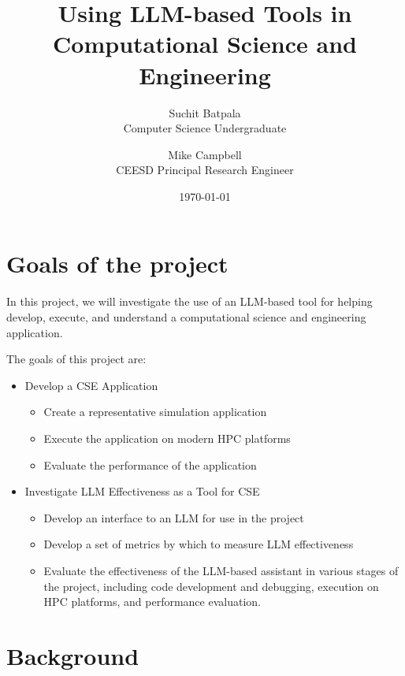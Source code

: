 \documentclass[11pt]{article}
\title{Using LLM-based Tools in Computational Science and Engineering}
\author{Suchit Batpala \\ \small{Computer Science Undergraduate} \and Mike Campbell \\ \small{CEESD Principal Research Engineer}}
\date{\today}
\begin{document}
\color{mainTextColor}
\maketitle

\section{Goals of the project}

In this project, we will investigate the use of an LLM-based tool for helping develop, execute, and understand a computational science and engineering application.

The goals of this project are:

\begin{itemize}
\item Develop a CSE Application
  \begin{itemize}
  \item Create a representative simulation application
  \item Execute the application on modern HPC platforms
  \item Evaluate the performance of the application
  \end{itemize}
\item Investigate LLM Effectiveness as a Tool for CSE
  \begin{itemize}
  \item Develop an interface to an LLM for use in the project
  \item Develop a set of metrics by which to measure LLM effectiveness
  \item Evaluate the effectiveness of the LLM-based assistant in various stages of the project, including code development and debugging, execution on HPC platforms, and performance evaluation.
  \end{itemize}
\end{itemize}

\section{Background}
\end{document}
